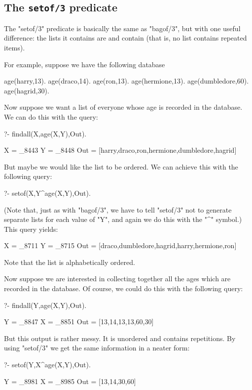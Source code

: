 \subsection*{The {\tt setof/3} predicate}\label{SUBSEC.L11.SETOF}

The "setof/3" predicate is basically the same as
"bagof/3", but with one useful difference: the lists it contains
are  and contain  (that is,
no list contains repeated items).

For example, suppose we have the following database
\begin{LPNcodedisplay}
age(harry,13).
age(draco,14).
age(ron,13).
age(hermione,13).
age(dumbledore,60).
age(hagrid,30).
\end{LPNcodedisplay}

Now suppose we want a list of everyone whose
age is recorded in the database. We can do this
with the query:
\begin{LPNcodedisplay}
?- findall(X,age(X,Y),Out).

X = _8443
Y = _8448
Out = [harry,draco,ron,hermione,dumbledore,hagrid]
\end{LPNcodedisplay}


But maybe we would like the list to be ordered. We can achieve
this with the following query:
\begin{LPNcodedisplay}
?- setof(X,Y^age(X,Y),Out).
\end{LPNcodedisplay}
(Note that, just as with "bagof/3", we have to tell "setof/3" not to
generate separate lists for each value of "Y", and again we do
this with the "^" symbol.)
This query yields:
\begin{LPNcodedisplay}
X = _8711
Y = _8715
Out = [draco,dumbledore,hagrid,harry,hermione,ron]
\end{LPNcodedisplay}
Note that the list is alphabetically ordered.

Now suppose we are interested in collecting together all the ages
which are recorded in the database.  Of course, we could do this with the
following query:
\begin{LPNcodedisplay}
?- findall(Y,age(X,Y),Out).

Y = _8847
X = _8851
Out = [13,14,13,13,60,30]
\end{LPNcodedisplay}

But this output is rather messy. It is unordered and contains
repetitions.  By using "setof/3" we get the same information in a neater
form:
\begin{LPNcodedisplay}
?- setof(Y,X^age(X,Y),Out).

Y = _8981
X = _8985
Out = [13,14,30,60]
\end{LPNcodedisplay}


